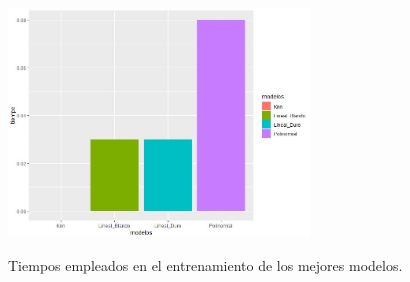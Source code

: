 \documentclass[10pt,twocolumn,letterpaper,a4paper]{article}
\begin{document}
\begin{figure}[!htbp] 
  \centering 
  \includegraphics[width=8cm]{Tiempos.jpg}\\ 
  \caption{Tiempos empleados en el entrenamiento de los mejores modelos.}
  \label{figura_2} 
\end{figure} 
\end{document}
